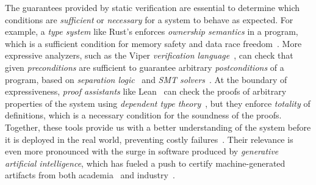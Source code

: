 The guarantees provided by static verification are essential to determine which
conditions are \textit{sufficient} or \textit{necessary} for a system to behave 
as expected. 
For example, a \textit{type system} like Rust's enforces 
\textit{ownership semantics} in a program, which is a sufficient condition for
memory safety and data race freedom~\cite{jung2018rustbelt}. 
More expressive analyzers, such as the Viper \textit{verification language}~\cite{mueller2016viper}, can
check that given \textit{preconditions} are sufficient to guarantee arbitrary
\textit{postconditions} of a program, based on \textit{separation logic}~\cite{reynolds2002separation} and
\textit{SMT solvers}~\cite{demoura2008z3}. 
At the boundary of expressiveness, \textit{proof assistants} like Lean~\cite{demoura2021lean4} can check
the proofs of arbitrary properties of the system using \textit{dependent type theory}~\cite{martinlof1984itt, coquand1988constructions}, but they enforce \textit{totality} of definitions, which is a
necessary condition for the soundness of the proofs.
Together, these tools provide us with a better understanding of the system
before it is deployed in the real world, preventing costly failures~\cite{leveson1993therac, edelman1997fdiv, lions1996ariane, durumeric2014heartbleed, lipp2018meltdown, kocher2019spectre}.
Their relevance is even more pronounced with the surge in software produced by
\textit{generative artificial intelligence}, which has fueled a push to certify
machine-generated artifacts from both academia~\cite{sun2024clover,yang2023leandojo,song2025leancopilot,thakur2025clever,poesia2022synchromesh,nagy2026chopchop,mundler2025typeconstrained} and industry~\cite{aws2024bedrock, trinh2024alphageometry, polu2022curriculum, lample2022hypertree}.

